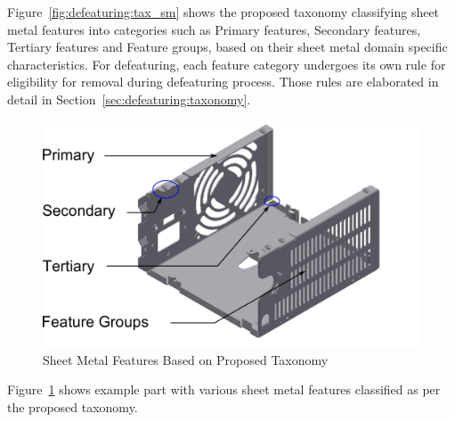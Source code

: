 		
%


Figure~\ref{fig:defeaturing:tax_sm} shows the proposed taxonomy classifying sheet metal features into categories such as Primary features, Secondary features, Tertiary features and Feature groups, based on their sheet metal domain specific characteristics. For defeaturing, each feature category undergoes its own rule for eligibility for removal during defeaturing process. Those rules are elaborated in detail in Section~\ref{sec:defeaturing:taxonomy}.


	\begin{figure} [!h]
		\centering
		\includegraphics[width=0.62\linewidth]{..//Common/images/SheetMetal_taxonomy_3.pdf}
		\caption{Sheet Metal Features Based on Proposed Taxonomy}
		\label{fig:defeaturing:classification}
	\end{figure}
	

Figure~\ref{fig:defeaturing:classification} shows example part with various sheet metal features classified as per the proposed taxonomy. %



